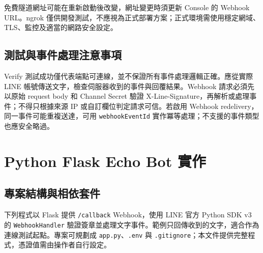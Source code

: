 \documentclass[12pt,a4paper]{report}
\begin{document}
免費隧道網址可能在重新啟動後改變，網址變更時須更新 Console 的 Webhook URL。ngrok 僅供開發測試，不應視為正式部署方案；正式環境需使用穩定網域、TLS、監控及適當的網路安全設定。

\section{測試與事件處理注意事項}
Verify 測試成功僅代表端點可連線，並不保證所有事件處理邏輯正確。應從實際 LINE 帳號傳送文字，檢查伺服器收到的事件與回覆結果。Webhook 請求必須先以原始 request body 和 Channel Secret 驗證 X-Line-Signature，再解析或處理事件；不得只根據來源 IP 或自訂欄位判定請求可信。若啟用 Webhook redelivery，同一事件可能重複送達，可用 \texttt{webhookEventId} 實作冪等處理；不支援的事件類型也應安全略過。

\chapter{Python Flask Echo Bot 實作}
\section{專案結構與相依套件}
下列程式以 Flask 提供 \texttt{/callback} Webhook，使用 LINE 官方 Python SDK v3 的 \texttt{WebhookHandler} 驗證簽章並處理文字事件。範例只回傳收到的文字，適合作為連線測試起點。專案可規劃成 \texttt{app.py}、\texttt{.env} 與 \texttt{.gitignore}；本文件提供完整程式，憑證值需由操作者自行設定。
\end{document}

